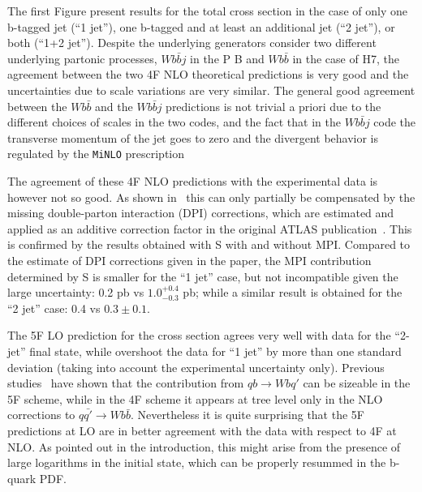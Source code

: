 \documentclass[11pt]{cernrep}
\newcommand{\Sherpa}{S\protect\scalebox{0.8}{HERPA}\xspace}
\newcommand{\Herwig}{H\protect\scalebox{0.8}{ERWIG}7\xspace}
\newcommand\MINLO{{\tt MiNLO}}
\newcommand{\POWHEGBOX}{P\protect\scalebox{0.8}{OWHEG} B\protect\scalebox{0.8}{OX}\xspace}
\begin{document}
The first Figure present results for the total cross section in the
case of only one b-tagged jet (``1 jet''), one b-tagged and at least
an additional jet (``2 jet''), or both (``1+2 jet''). Despite the
underlying generators consider two different underlying partonic
processes, $Wb\bar{b}j$ in the \POWHEGBOX{} and $Wb\bar{b}$ in the
case of \Herwig, the agreement between the two 4F NLO theoretical
predictions is very good and the uncertainties due to scale variations
are very similar.  The general good agreement between the $Wb\bar{b}$
and the $Wb\bar{b}j$ predictions is not trivial a priori due to the
different choices of scales in the two codes, and the fact that in the
$Wb\bar{b}j$ code the transverse momentum of the jet goes to zero and
the divergent behavior is regulated by the \MINLO{}
prescription~\cite{Luisoni:2015mpa}


The agreement of these 4F NLO predictions with the experimental data is however not so
good. As shown in~\cite{Luisoni:2015mpa} this can only partially be
compensated by the missing double-parton interaction (DPI)
corrections, which are estimated and applied as an additive correction
factor in the original ATLAS publication~\cite{Aad:2013vka}.
This is confirmed by the results obtained with \Sherpa with and without MPI.  
Compared to the estimate of DPI corrections given in the paper, the MPI contribution determined by \Sherpa is smaller for the ``1 jet''
case, but not incompatible given the large uncertainty: 0.2 pb vs $1.0^{+0.4}_{-0.3}$ pb; while a similar result is obtained
for the ``2 jet'' case: 0.4 vs $0.3\pm0.1$. 

The 5F LO prediction for the cross section agrees very well with data for the ``2-jet'' final state, while overshoot the data for ``1 jet'' by
more than one standard deviation (taking into account the experimental uncertainty only). Previous studies~\cite{Caola:2011pz}
have shown that the contribution from $qb \to Wbq'$ can be sizeable in the 5F scheme, while in the 4F scheme it appears at tree
level only in the NLO corrections to $q\bar{q'}\to Wb\bar{b}$. Nevertheless it is quite surprising that the 5F predictions at LO are in better
agreement with the data with respect to 4F at NLO. As pointed out in the introduction, this might arise from the presence of
large logarithms in the initial state, which can be properly resummed in the b-quark PDF. 
\end{document}
